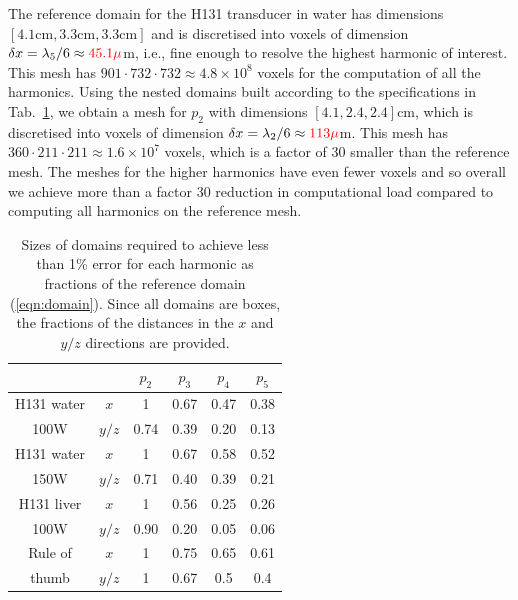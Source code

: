 \documentclass[preprint]{JASA}
\newcommand{\red}[1]{{\color{red} #1}}
\begin{document}
The reference domain for the H131 transducer in water has dimensions 
$[4.1\text{cm},3.3\text{cm},3.3\text{cm}]$ and is discretised into voxels of dimension 
$\delta x = \lambda_5/6\approx \red{45.1\mu}$m, i.e., fine enough to 
resolve the highest harmonic of interest. This mesh has 
$901\cdot 732\cdot 732\approx 4.8\times 10^8$ voxels for the computation of all 
the harmonics. Using the nested domains built according to the specifications in 
Tab.~\ref{tab:convergence_domain}, we obtain a mesh for $p_2$ with dimensions
$[4.1, 2.4, 2.4]$cm, which is discretised into voxels of dimension 
$\delta x = \lambda_2/6\approx \red{113\mu}$m. This mesh has 
$360\cdot 211\cdot 211\approx 1.6\times 10^7$ voxels, which is a factor of 
30 smaller than the reference mesh. The meshes for the higher harmonics have 
even fewer voxels and so overall we achieve more than a factor 30 reduction in 
computational load compared to computing all harmonics on the reference mesh.
\begin{table}[h!]
    \centering
    \begin{tabular}{c | c  c  c  c  c}
        \hline\hline
             &     & $p_2$ & $p_3$ & $p_4$ & $p_5$ \\
        \hline
        H131 water & $x$   & 1 & 0.67 & 0.47 & 0.38 \\
        100W & $y/z$ & 0.74 & 0.39 & 0.20 & 0.13 \\
        \hline
        H131 water & $x$   & 1 & 0.67 & 0.58 & 0.52 \\
        150W & $y/z$ & 0.71 & 0.40 & 0.39 & 0.21 \\
        \hline
        H131 liver & $x$   & 1 & 0.56 & 0.25 & 0.26 \\
        100W & $y/z$ & 0.90 & 0.20 & 0.05 & 0.06 \\
        \hline
        Rule of & $x$  &  1 & 0.75 & 0.65 & 0.61 \\
        thumb   & $y/z$ & 1 & 0.67 & 0.5 & 0.4
    \end{tabular}
    \caption{Sizes of domains required to achieve less than 1\% error for each 
    harmonic as fractions of the reference domain (\ref{eqn:domain}). Since all 
    domains are boxes, the fractions of the distances in the $x$ and $y/z$ directions 
    are provided.}
    \label{tab:convergence_domain}
\end{table}
\end{document}
